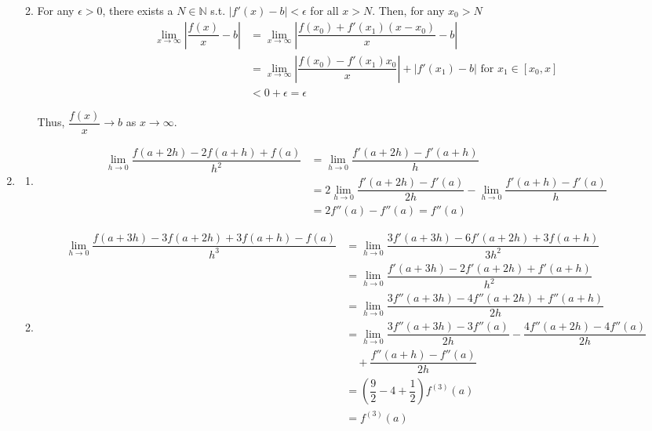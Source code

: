 \documentclass[12pt]{article}
\begin{document}
\begin{enumerate}
\begin{enumerate}
        \newpage
        \item For any $\epsilon > 0$, there exists a $N\in\mathbb{N}$ s.t. $|f'(x) - b| < \epsilon$ for all $x > N$.
        Then, for any $x_0 > N$
        \begin{align*}
            \lim_{x\to\infty}|\dfrac{f(x)}{x} - b| &= \lim_{x\to\infty}|\dfrac{f(x_0) + f'(x_1)(x-x_0)}{x} - b|\\
            &=\lim_{x\to\infty} |\dfrac{f(x_0)- f'(x_1)x_0}{x}| + |f'(x_1) - b|\text{ for } x_1\in [x_0, x]\\
            &< 0 + \epsilon = \epsilon
        \end{align*}

        Thus, $\dfrac{f(x)}{x} \to b$ as $x\to\infty$.
    \end{enumerate}

    \item\begin{enumerate}
        \item \begin{align*}
            \lim_{h\to 0} \dfrac{f(a+2h)-2f(a+h)+f(a)}{h^2} &= \lim_{h\to 0} \dfrac{f'(a+2h) - f'(a+h)}{h}\\
            &= 2\lim_{h\to 0} \dfrac{f'(a + 2h) - f'(a)}{2h} - \lim_{h\to 0}\dfrac{f'(a + h) - f'(a)}{h}\\
            &= 2f''(a) - f''(a) = f''(a)
        \end{align*}    

        \item \begin{align*}
            \lim_{h\to 0} \dfrac{f(a + 3h) - 3f(a + 2h) + 3f(a + h) - f(a)}{h^3} &= \lim_{h\to 0} \dfrac{3f'(a+3h) - 6f'(a + 2h) + 3f(a + h)}{3h^2}\\
            &= \lim_{h\to 0} \dfrac{f'(a + 3h) - 2f'(a+2h) + f'(a + h)}{h^2}\\
            &= \lim_{h\to 0} \dfrac{3f''(a + 3h) - 4f''(a + 2h) + f''(a+h)}{2h}\\
            &= \lim_{h\to 0} \dfrac{3f''(a+3h) - 3f''(a)}{2h} - \dfrac{4f''(a+2h) - 4f''(a)}{2h}\\
            &\quad+ \dfrac{f''(a + h) - f''(a)}{2h}\\
            &= (\dfrac{9}{2} - 4 + \dfrac{1}{2}) f^{(3)}(a)\\
            &= f^{(3)}(a)
        \end{align*}

    \end{enumerate}
\end{enumerate}
\end{document}
